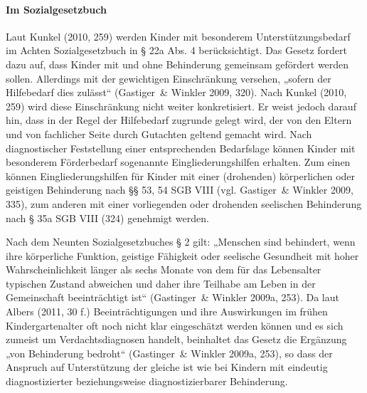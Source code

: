 \paragraph{Im Sozialgesetzbuch}
Laut Kunkel (2010, 259) werden Kinder mit besonderem Unterstützungsbedarf im Achten Sozialgesetzbuch in § 22a Abs. 4 berücksichtigt. Das Gesetz fordert dazu auf, dass Kinder mit und ohne Behinderung gemeinsam gefördert werden sollen. Allerdings mit der gewichtigen Einschränkung versehen, „sofern der Hilfebedarf dies zulässt“ (Gastiger~\& Winkler 2009, 320). Nach Kunkel (2010, 259) wird diese Einschränkung nicht weiter konkretisiert. Er weist jedoch darauf hin, dass in der Regel der Hilfebedarf zugrunde gelegt wird, der von den Eltern und von fachlicher Seite durch Gutachten geltend gemacht wird. Nach diagnostischer Feststellung einer entsprechenden Bedarfslage können Kinder mit besonderem Förderbedarf sogenannte Eingliederungshilfen erhalten. Zum einen können Eingliederungshilfen für Kinder mit einer (drohenden) körperlichen oder geistigen Behinderung nach §§ 53, 54 SGB VIII (vgl. Gastiger~\& Winkler 2009, 335), zum anderen mit einer vorliegenden oder drohenden seelischen Behinderung nach § 35a SGB VIII (324) genehmigt werden.
 
Nach dem Neunten Sozialgesetzbuches § 2 gilt: „Menschen sind behindert, wenn ihre körperliche Funktion, geistige Fähigkeit oder seelische Gesundheit mit hoher Wahrscheinlichkeit länger als sechs Monate von dem für das Lebensalter typischen Zustand abweichen und daher ihre Teilhabe am Leben in der Gemeinschaft beeinträchtigt ist“ (Gastinger~\& Winkler 2009a, 253). Da laut Albers (2011, 30 f.) Beeinträchtigungen und ihre Auswirkungen im frühen Kindergartenalter oft noch nicht klar eingeschätzt werden können und es sich zumeist um Verdachtsdiagnosen handelt, beinhaltet das Gesetz die Ergänzung „von Behinderung bedroht“ (Gastinger~\& Winkler 2009a, 253), so dass der Anspruch auf Unterstützung der gleiche ist wie bei Kindern mit eindeutig diagnostizierter beziehungsweise diagnostizierbarer Behinderung. 

